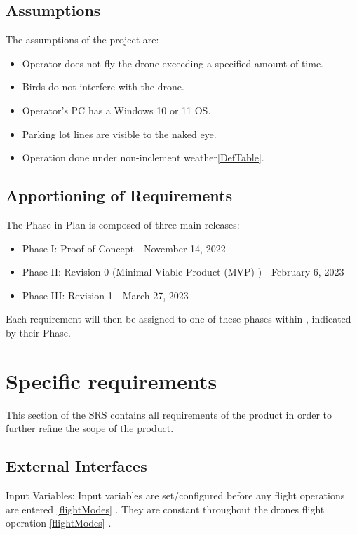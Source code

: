 \documentclass{article}
\begin{document}
\subsection{Assumptions}
\label{sec:Assumptions}
The assumptions of the project are:
\begin{itemize}

  \item Operator does not fly the drone exceeding a specified amount of time.
  \item Birds do not interfere with the drone.
  \item Operator's PC has a Windows 10 or 11 OS.
  \item Parking lot lines are visible to the naked eye.
  \item Operation done under non-inclement weather\ref{DefTable}. 

\end{itemize}

\subsection{Apportioning of Requirements}
The Phase in Plan is composed of three main releases:  
\begin{itemize}
    \item Phase I: Proof of Concept - November 14, 2022
    \item Phase II: Revision 0 (Minimal Viable Product (MVP) ) - February 6, 2023 
    \item Phase III: Revision 1 - March 27, 2023
\end{itemize}
Each requirement will then be assigned to one of these phases within , indicated by their Phase. 

\section{Specific requirements }
\label{sec:Req}
This section of the SRS contains all requirements of the product in order to further refine the scope of the product.

\subsection{External Interfaces}
Input Variables: Input variables are set/configured before any flight operations are entered \ref{flightModes} . They are constant throughout the drones flight operation \ref{flightModes} .
\end{document}
